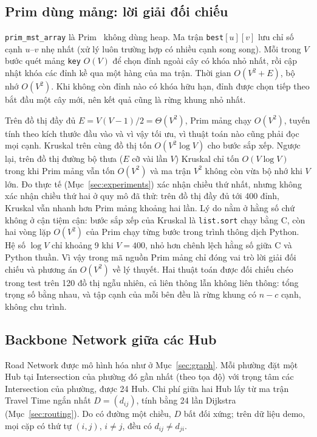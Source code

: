 \subsection{Prim dùng mảng: lời giải đối chiếu}

\texttt{prim\_mst\_array} là Prim~\cite{prim1957} không dùng heap. Ma trận \texttt{best}$[u][v]$ lưu chỉ số cạnh $u$--$v$ nhẹ nhất (xử lý luôn trường hợp có nhiều cạnh song song). Mỗi trong $V$ bước quét mảng \texttt{key} $O(V)$ để chọn đỉnh ngoài cây có khóa nhỏ nhất, rồi cập nhật khóa các đỉnh kề qua một hàng của ma trận. Thời gian $O(V^2 + E)$, bộ nhớ $O(V^2)$. Khi không còn đỉnh nào có khóa hữu hạn, đỉnh được chọn tiếp theo bắt đầu một cây mới, nên kết quả cũng là rừng khung nhỏ nhất.

Trên đồ thị đầy đủ $E = V(V-1)/2 = \Theta(V^2)$, Prim mảng chạy $O(V^2)$, tuyến tính theo kích thước đầu vào và vì vậy tối ưu, vì thuật toán nào cũng phải đọc mọi cạnh. Kruskal trên cùng đồ thị tốn $O(V^2\log V)$ cho bước sắp xếp. Ngược lại, trên đồ thị đường bộ thưa ($E$ cỡ vài lần $V$) Kruskal chỉ tốn $O(V\log V)$ trong khi Prim mảng vẫn tốn $O(V^2)$ và ma trận $V^2$ không còn vừa bộ nhớ khi $V$ lớn. Đo thực tế (Mục~\ref{sec:experiments}) xác nhận chiều thứ nhất, nhưng không xác nhận chiều thứ hai ở quy mô đã thử: trên đồ thị đầy đủ tới 400 đỉnh, Kruskal vẫn nhanh hơn Prim mảng khoảng hai lần. Lý do nằm ở hằng số chứ không ở cận tiệm cận: bước sắp xếp của Kruskal là \texttt{list.sort} chạy bằng C, còn hai vòng lặp $O(V^2)$ của Prim chạy từng bước trong trình thông dịch Python. Hệ số $\log V$ chỉ khoảng 9 khi $V = 400$, nhỏ hơn chênh lệch hằng số giữa C và Python thuần. Vì vậy trong mã nguồn Prim mảng chỉ đóng vai trò lời giải đối chiếu và phương án $O(V^2)$ về lý thuyết. Hai thuật toán được đối chiếu chéo trong test trên 120 đồ thị ngẫu nhiên, cả liên thông lẫn không liên thông: tổng trọng số bằng nhau, và tập cạnh của mỗi bên đều là rừng khung có $n - c$ cạnh, không chu trình.

\subsection{Backbone Network giữa các Hub}

Road Network được mô hình hóa như ở Mục~\ref{sec:graph}. Mỗi phường đặt một Hub tại Intersection của phường đó gần nhất (theo tọa độ) với trọng tâm các Intersection của phường, được 24 Hub. Chi phí giữa hai Hub lấy từ ma trận Travel Time ngắn nhất $D = (d_{ij})$, tính bằng 24 lần Dijkstra (Mục~\ref{sec:routing}). Do có đường một chiều, $D$ bất đối xứng; trên dữ liệu demo, mọi cặp có thứ tự $(i, j)$, $i \ne j$, đều có $d_{ij} \ne d_{ji}$.

